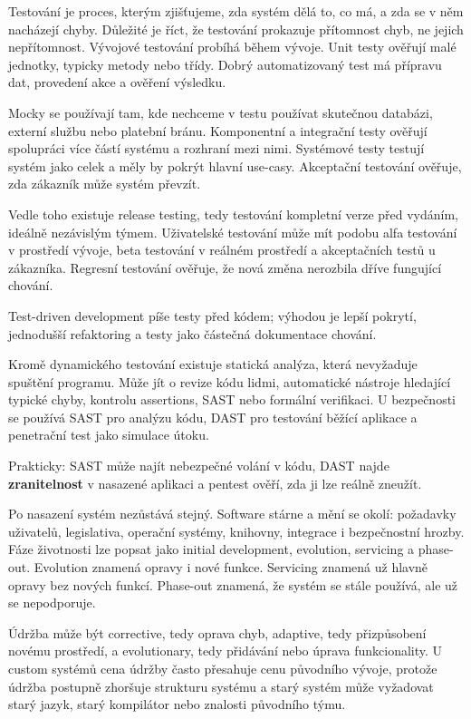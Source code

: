 \documentclass[11pt,a4paper]{article}
\begin{document}
Testování je proces, kterým zjišťujeme, zda systém dělá to, co má, a zda se v něm nacházejí chyby. Důležité je říct, že testování prokazuje přítomnost chyb, ne jejich nepřítomnost. Vývojové testování probíhá během vývoje. Unit testy ověřují malé jednotky, typicky metody nebo třídy. Dobrý automatizovaný test má přípravu dat, provedení akce a ověření výsledku.

Mocky se používají tam, kde nechceme v testu používat skutečnou databázi, externí službu nebo platební bránu. Komponentní a integrační testy ověřují spolupráci více částí systému a rozhraní mezi nimi. Systémové testy testují systém jako celek a měly by pokrýt hlavní use-casy. Akceptační testování ověřuje, zda zákazník může systém převzít.

Vedle toho existuje release testing, tedy testování kompletní verze před vydáním, ideálně nezávislým týmem. Uživatelské testování může mít podobu alfa testování v prostředí vývoje, beta testování v reálném prostředí a akceptačních testů u zákazníka. Regresní testování ověřuje, že nová změna nerozbila dříve fungující chování.

Test-driven development píše testy před kódem; výhodou je lepší pokrytí, jednodušší refaktoring a testy jako částečná dokumentace chování.

Kromě dynamického testování existuje statická analýza, která nevyžaduje spuštění programu. Může jít o revize kódu lidmi, automatické nástroje hledající typické chyby, kontrolu assertions, SAST nebo formální verifikaci. U bezpečnosti se používá SAST pro analýzu kódu, DAST pro testování běžící aplikace a penetrační test jako simulace útoku.

Prakticky: SAST může najít nebezpečné volání v kódu, DAST najde \textbf{zranitelnost} v nasazené aplikaci a pentest ověří, zda ji lze reálně zneužít.

Po nasazení systém nezůstává stejný. Software stárne a mění se okolí: požadavky uživatelů, legislativa, operační systémy, knihovny, integrace i bezpečnostní hrozby. Fáze životnosti lze popsat jako initial development, evolution, servicing a phase-out. Evolution znamená opravy i nové funkce. Servicing znamená už hlavně opravy bez nových funkcí. Phase-out znamená, že systém se stále používá, ale už se nepodporuje.

Údržba může být corrective, tedy oprava chyb, adaptive, tedy přizpůsobení novému prostředí, a evolutionary, tedy přidávání nebo úprava funkcionality. U custom systémů cena údržby často přesahuje cenu původního vývoje, protože údržba postupně zhoršuje strukturu systému a starý systém může vyžadovat starý jazyk, starý kompilátor nebo znalosti původního týmu.
\end{document}
